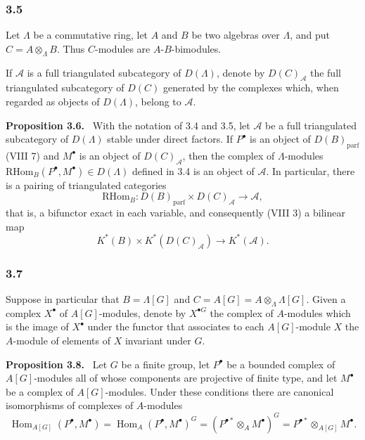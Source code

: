 \documentclass[11pt]{article}
\newenvironment{statement}[1]{\par\medskip\noindent\textbf{#1.}\ }{\par\medskip}
\DeclareMathOperator{\Hom}{Hom}
\providecommand{\RHom}{\mathrm{RHom}}
\providecommand{\parf}{\mathrm{parf}}
\providecommand{\RHom}{\mathrm{RHom}}
\providecommand{\Hom}{\operatorname{Hom}}
\providecommand{\RHom}{\mathrm R\mathcal{H}om}
\providecommand{\parf}{\mathrm{parf}}
\begin{document}
\subsubsection*{3.5}

Let $\Lambda$ be a commutative ring, let $A$ and $B$ be two algebras over $\Lambda$, and put $C=A\otimes_\Lambda B$. Thus $C$-modules are $A$-$B$-bimodules.

If $\mathcal A$ is a full triangulated subcategory of $D(\Lambda)$, denote by $D(C)_{\mathcal A}$ the full triangulated subcategory of $D(C)$ generated by the complexes which, when regarded as objects of $D(\Lambda)$, belong to $\mathcal A$.

\begin{statement}{Proposition 3.6}
With the notation of 3.4 and 3.5, let $\mathcal A$ be a full triangulated subcategory of $D(\Lambda)$ stable under direct factors. If $P^\bullet$ is an object of $D(B)_{\parf}$ (VIII 7) and $M^\bullet$ is an object of $D(C)_{\mathcal A}$, then the complex of $\Lambda$-modules $\RHom_B(P^\bullet,M^\bullet)\in D(\Lambda)$ defined in 3.4 is an object of $\mathcal A$. In particular, there is a pairing of triangulated categories
\[
\RHom_B:D(B)_{\parf}\times D(C)_{\mathcal A}\longrightarrow \mathcal A,
\tag{3.6.1}
\]
that is, a bifunctor exact in each variable, and consequently (VIII 3) a bilinear map
\[
K^*(B)\times K^*(D(C)_{\mathcal A})\longrightarrow K^*(\mathcal A).
\tag{3.6.2}
\]
\end{statement}

\subsubsection*{3.7}

Suppose in particular that $B=\Lambda[G]$ and $C=A[G]=A\otimes_\Lambda\Lambda[G]$. Given a complex $X^\bullet$ of $A[G]$-modules, denote by $X^{\bullet G}$ the complex of $A$-modules which is the image of $X^\bullet$ under the functor that associates to each $A[G]$-module $X$ the $A$-module of elements of $X$ invariant under $G$.

\begin{statement}{Proposition 3.8}
Let $G$ be a finite group, let $P^\bullet$ be a bounded complex of $A[G]$-modules all of whose components are projective of finite type, and let $M^\bullet$ be a complex of $A[G]$-modules. Under these conditions there are canonical isomorphisms of complexes of $A$-modules
\[
\Hom_{A[G]}(P^\bullet,M^\bullet)=\Hom_A(P^\bullet,M^\bullet)^G=(P^{\bullet *}\otimes_A M^\bullet)^G=P^{\bullet *}\otimes_{A[G]}M^\bullet.
\tag{3.8.1}
\]
\end{statement}
\end{document}
